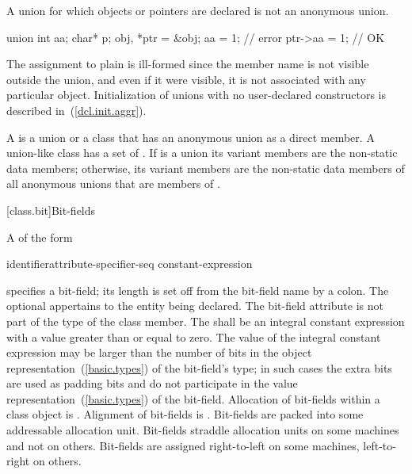 \pnum
A union for which objects or pointers are declared is not an anonymous union.
\enterexample

\begin{codeblock}
union { int aa; char* p; } obj, *ptr = &obj;
aa = 1;                         // error
ptr->aa = 1;                    // OK
\end{codeblock}

The assignment to plain  is ill-formed since the member name
is not visible outside the union, and even if it were visible, it is not
associated with any particular object.
\exitexample
\enternote
Initialization of unions with no user-declared constructors is described
in~(\ref{dcl.init.aggr}).
\exitnote

\pnum
A  is a union or a class that has an anonymous union as a direct member. A union-like class  has a set of . If  is a union its variant members are the non-static data members; otherwise, its variant members are the non-static data members of all anonymous unions that are members of .

[class.bit]{Bit-fields}%

\pnum
A  of the form

\begin{ncbnftab}
identifier\opt  attribute-specifier-seq\opt \terminal{:} constant-expression
\end{ncbnftab}

%
%
specifies a bit-field;
its length is set off from the bit-field name by a colon. The optional  appertains to the entity being declared. The bit-field
attribute is not part of the type of the class member. The
 shall be an integral constant expression
with a value greater than or equal to zero. The
value of the integral constant expression may
be larger than the number of bits in the object
representation~(\ref{basic.types}) of the bit-field's type; in such
cases the extra bits are used as padding bits and do not participate in
the value representation~(\ref{basic.types}) of the bit-field.
%
Allocation of bit-fields within a class object is
.
%
Alignment of bit-fields is .
%
Bit-fields are packed into some addressable allocation unit.
\enternote
Bit-fields straddle allocation units on some machines and not on others.
Bit-fields are assigned right-to-left on some machines, left-to-right on
others.
\exitnote

